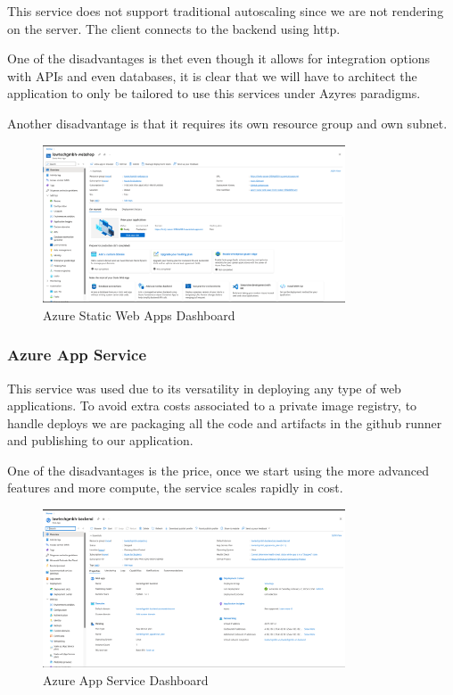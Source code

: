 \documentclass{llncs}
\begin{document}
This service does not support traditional autoscaling since we are not rendering on the server. The client connects to the backend using http.

One of the disadvantages is thet even though it allows for integration options with APIs and even databases, it is clear that we will have to architect the application to only be tailored to use this services under Azyres paradigms.

Another disadvantage is that it requires its own resource group and own subnet.\\
\begin{figure}[H]
    \centering
    \includegraphics[width=0.8\textwidth]{../images/frontend_azure.png}
    \vspace{0.01\textwidth}
    \caption{Azure Static Web Apps Dashboard}
    \label{fig:frontend_azure}
\end{figure}


\subsubsection{Azure App Service}

This service was used due to its versatility in deploying any type of web applications. To avoid extra costs associated to a private image registry,
to handle deploys we are packaging all the code and artifacts in the github runner and publishing to our application.

One of the disadvantages is the price, once we start using the more advanced features and more compute, the service scales rapidly in cost.\\

\begin{figure}[H]
    \centering
    \includegraphics[width=0.8\textwidth]{../images/backend_azure.png}
    \vspace{0.01\textwidth}
    \caption{Azure App Service Dashboard}
    \label{fig:backend_azure}
\end{figure}
\end{document}
